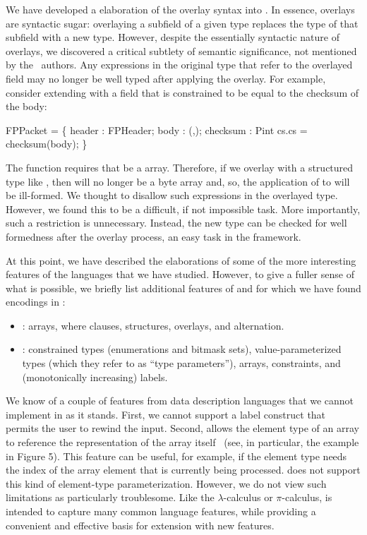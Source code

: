 We have developed a elaboration of the overlay syntax into \ddc{}. In
essence, overlays are syntactic sugar: overlaying a subfield of a
given type replaces the type of that subfield with a new type.
However, despite the essentially syntactic nature of overlays, we
discovered a critical subtlety of semantic significance, not mentioned
by the \packettypes\ authors. Any expressions in the original type that refer to the
overlayed field may no longer be well typed after applying the
overlay. For example, consider extending  with a field
that is constrained to be equal to the checksum of the body:
\begin{code}
FPPacket = \Pstruct \{
  header   : FPHeader;
  body     : \Pbyte \Parray{}(\Pnosep,\Peof);
  checksum : Pint \Pwhere{} cs.cs = checksum(body);
\}
\end{code}
\noindent
The  function requires that  be a 
array. Therefore, if we overlay  with a structured type like
, then  will no longer be a byte array and, so,
the application of  to  will be
ill-formed.  We thought to disallow such expressions in the overlayed
type. However, we found this to be a difficult, if not impossible
task.  More importantly, such a restriction is unnecessary.  Instead,
the new type can be checked for well formedness after the overlay
process, an easy task in the \ddc{} framework.

At this point, we have described the elaborations of some of the more
interesting features of the languages that we have studied. However,
to give a fuller sense of what is possible, we briefly list additional
features of \datascript{} and \packettypes{} for which we have found
encodings in \ddc{}:
\begin{itemize}
\item \packettypes{}: arrays, where clauses, structures, overlays,
  and alternation.
\item \datascript{}: constrained types (enumerations and bitmask
  sets), value-parameterized types (which they refer to as ``type
  parameters''), arrays, constraints, and (monotonically increasing)
  labels. 
\end{itemize}

We know of a couple of features from data description languages that
we cannot implement in \ddc{} as it stands.  First, we cannot support
a label construct that permits the user to rewind the input. Second,
\datascript{} allows the element type of an array to reference the
representation of the array itself~\cite{gpce02} (see, in particular,
the example in Figure 5). This feature can be useful, for example, if
the element type needs the index of the array element that is
currently being processed.  \ddc{} does not support this kind of
element-type parameterization. However, we do not view such
limitations as particularly troublesome. Like the $\lambda$-calculus
or $\pi$-calculus, \ddc{} is intended to capture many common language
features, while providing a convenient and effective basis for
extension with new features.


